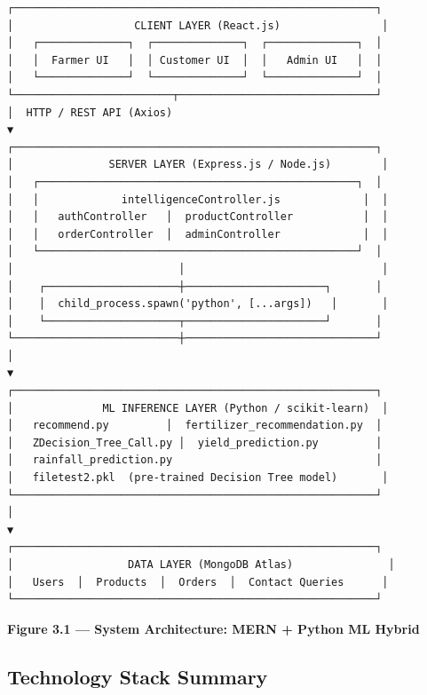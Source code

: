 \documentclass[12pt,a4paper]{report}
\begin{document}
\begin{verbatim}
┌─────────────────────────────────────────────────────────┐
│                   CLIENT LAYER (React.js)                │
│   ┌──────────────┐  ┌──────────────┐  ┌──────────────┐  │
│   │  Farmer UI   │  │ Customer UI  │  │   Admin UI   │  │
│   └──────────────┘  └──────────────┘  └──────────────┘  │
└─────────────────────────┬───────────────────────────────┘
│  HTTP / REST API (Axios)
▼
┌─────────────────────────────────────────────────────────┐
│               SERVER LAYER (Express.js / Node.js)        │
│   ┌──────────────────────────────────────────────────┐  │
│   │             intelligenceController.js             │  │
│   │   authController   │  productController           │  │
│   │   orderController  │  adminController             │  │
│   └──────────────────────────────────────────────────┘  │
│                          │                               │
│    ┌─────────────────────┼──────────────────────┐       │
│    │  child_process.spawn('python', [...args])   │       │
│    └─────────────────────┬──────────────────────┘       │
└──────────────────────────┼──────────────────────────────┘
│
▼
┌─────────────────────────────────────────────────────────┐
│              ML INFERENCE LAYER (Python / scikit-learn)  │
│   recommend.py         │  fertilizer_recommendation.py  │
│   ZDecision_Tree_Call.py │  yield_prediction.py         │
│   rainfall_prediction.py                                │
│   filetest2.pkl  (pre-trained Decision Tree model)       │
└─────────────────────────────────────────────────────────┘
│
▼
┌─────────────────────────────────────────────────────────┐
│                  DATA LAYER (MongoDB Atlas)               │
│   Users  │  Products  │  Orders  │  Contact Queries      │
└─────────────────────────────────────────────────────────┘
\end{verbatim}

\textbf{Figure 3.1 — System Architecture: MERN + Python ML Hybrid}

\subsection{Technology Stack Summary}
\end{document}
